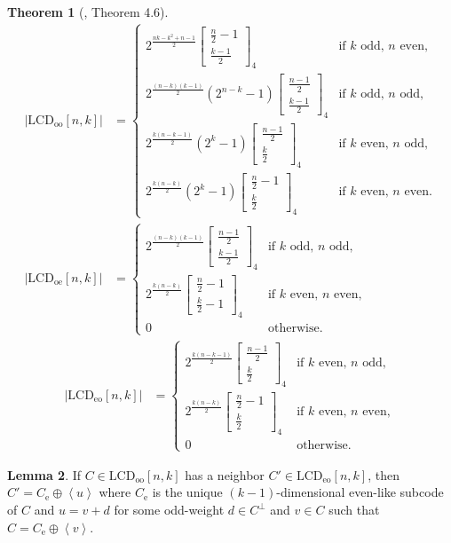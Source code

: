 \documentclass[11pt]{article}
\theoremstyle{definition}
\newtheorem{theorem}{Theorem}[section]
\newtheorem{lemma}[theorem]{Lemma}
\newcommand{\Qbinom}[3]{{\begin{bmatrix} #1 \\ #2 \end{bmatrix}}_{#3}} %
\newcommand{\Abs}[1]{\left|#1\right|}
\newcommand{\Ang}[1]{\left\langle#1\right\rangle}
\newcommand{\LCDoo}[2]{\mathrm{LCD}_{\mathrm{oo}} [#1, #2]}
\newcommand{\LCDoe}[2]{\mathrm{LCD}_{\mathrm{oe}} [#1, #2]}
\newcommand{\LCDeo}[2]{\mathrm{LCD}_{\mathrm{eo}} [#1, #2]}
\newcommand{\CodeCe}{C_{\mathrm{e}}}
\begin{document}
\begin{theorem}[\cite{CMTQ18}, Theorem 4.6]\label{thm:CMTQ-count}
	\begin{align*}
		\Abs{\LCDoo{n}{k}}
		&= \begin{cases}
			2^{\frac{n k - k^2 + n - 1}{2}}
			\Qbinom{\tfrac{n}{2} - 1}{\tfrac{k - 1}{2}}{4}
			&\text{if $k$ odd, $n$ even}, \\
			2^{\frac{(n - k)(k - 1)}{2}}
			(2^{n - k} - 1)
			\Qbinom{\tfrac{n - 1}{2}}{\tfrac{k - 1}{2}}{4}
			&\text{if $k$ odd, $n$ odd}, \\
			2^{\frac{k(n - k - 1)}{2}}
			(2^k - 1)
			\Qbinom{\tfrac{n - 1}{2}}{\tfrac{k}{2}}{4}
			&\text{if $k$ even, $n$ odd}, \\
			2^{\frac{k(n - k)}{2}}
			(2^k - 1)
			\Qbinom{\tfrac{n}{2} - 1}{\tfrac{k}{2}}{4}
			&\text{if $k$ even, $n$ even}.
		\end{cases} \\
		\Abs{\LCDoe{n}{k}}
		&= \begin{cases}
			2^{\frac{(n - k)(k - 1)}{2}}
			\Qbinom{\tfrac{n - 1}{2}}{\tfrac{k - 1}{2}}{4}
			&\text{if $k$ odd, $n$ odd}, \\
			2^{\frac{k(n - k)}{2}}
			\Qbinom{\tfrac{n}{2} - 1}{\tfrac{k}{2} - 1}{4}
			&\text{if $k$ even, $n$ even}, \\
			0
			&\text{otherwise}.
		\end{cases} \end{align*}
		\begin{align*}
		\Abs{\LCDeo{n}{k}}
		&= \begin{cases}
			2^{\frac{k(n - k - 1)}{2}}
			\Qbinom{\tfrac{n - 1}{2}}{\tfrac{k}{2}}{4}
			&\text{if $k$ even, $n$ odd}, \\
			2^{\frac{k(n - k)}{2}}
			\Qbinom{\tfrac{n}{2} - 1}{\tfrac{k}{2}}{4}
			&\text{if $k$ even, $n$ even}, \\
			0
			&\text{otherwise}.
		\end{cases}
	\end{align*}
\end{theorem}

\begin{lemma}\label{lem:ooeo-nec}
	If $C \in \LCDoo{n}{k}$ has a neighbor $C' \in \LCDeo{n}{k}$, then $C' = \CodeCe \oplus \Ang{u}$ where $\CodeCe$ is the unique $(k - 1)$-dimensional even-like subcode of $C$ and $u = v + d$ for some odd-weight $d \in C^{\perp}$ and $v \in C$ such that $C = \CodeCe \oplus \Ang{v}$.
\end{lemma}
\end{document}
